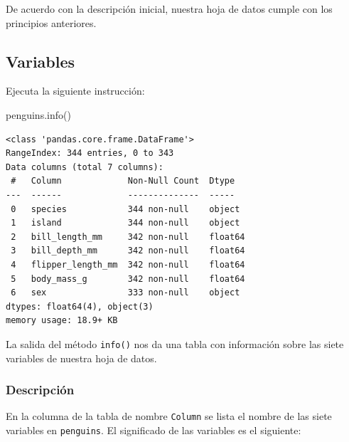 \documentclass[
  a4paper,
  noprof,
  12pt,
  notoc,
  nosols,
  nobib]{mnye}
\newenvironment{Shaded}{\begin{snugshade}}{\end{snugshade}}
\newcommand{\NormalTok}[1]{\textcolor[rgb]{0.00,0.23,0.31}{#1}}
\theoremstyle{definition}
\theoremstyle{remark}
\begin{document}
De acuerdo con la descripción inicial, nuestra hoja de datos cumple con
los principios anteriores.

\hypertarget{variables}{%
\subsection{Variables}\label{variables}}

Ejecuta la siguiente instrucción:

\begin{Shaded}
\begin{Highlighting}[]
\NormalTok{penguins.info()}
\end{Highlighting}
\end{Shaded}

\begin{verbatim}
<class 'pandas.core.frame.DataFrame'>
RangeIndex: 344 entries, 0 to 343
Data columns (total 7 columns):
 #   Column             Non-Null Count  Dtype  
---  ------             --------------  -----  
 0   species            344 non-null    object 
 1   island             344 non-null    object 
 2   bill_length_mm     342 non-null    float64
 3   bill_depth_mm      342 non-null    float64
 4   flipper_length_mm  342 non-null    float64
 5   body_mass_g        342 non-null    float64
 6   sex                333 non-null    object 
dtypes: float64(4), object(3)
memory usage: 18.9+ KB
\end{verbatim}

La salida del método \texttt{info()} nos da una tabla con información
sobre las siete variables de nuestra hoja de datos.

\hypertarget{descripciuxf3n}{%
\subsubsection{Descripción}\label{descripciuxf3n}}

En la columna de la tabla de nombre \texttt{Column} se lista el nombre
de las siete variables en \texttt{penguins}. El significado de las
variables es el siguiente:
\end{document}
